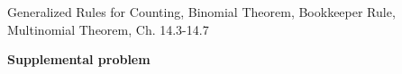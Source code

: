 \documentclass[handout]{mcs}
\begin{document}

\begin{staffnotes}
  Generalized Rules for Counting, Binomial Theorem, Bookkeeper Rule,
  Multinomial Theorem, Ch. 14.3-14.7
\end{staffnotes}



\begin{center}
\textbf{\large Supplemental problem}
\end{center}



\end{document}
